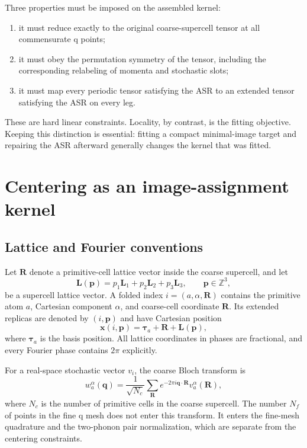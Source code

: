 \documentclass{article}
\newcommand{\Nc}{N_c}
\newcommand{\Nf}{N_f}
\begin{document}
Three properties must be imposed on the assembled kernel:
\begin{enumerate}
    \item it must reduce exactly to the original coarse-supercell tensor at
    all commensurate q points;
    \item it must obey the permutation symmetry of the tensor, including the
    corresponding relabeling of momenta and stochastic slots;
    \item it must map every periodic tensor satisfying the ASR to an extended
    tensor satisfying the ASR on every leg.
\end{enumerate}
These are hard linear constraints. Locality, by contrast, is the fitting
objective. Keeping this distinction is essential: fitting a compact
minimal-image target and repairing the ASR afterward generally changes the
kernel that was fitted.

\section{Centering as an image-assignment kernel}
\label{sec:kernel}

\subsection{Lattice and Fourier conventions}
\label{sec:notation}

Let $\bm R$ denote a primitive-cell lattice vector inside the coarse
supercell, and let
\begin{equation}
    \bm L(\bm p)=p_1\bm L_1+p_2\bm L_2+p_3\bm L_3,
    \qquad \bm p\in\mathbb Z^3,
    \label{eq:supercell-translation}
\end{equation}
be a supercell lattice vector. A folded index $i=(a,\alpha,\bm R)$ contains
the primitive atom $a$, Cartesian component $\alpha$, and coarse-cell
coordinate $\bm R$. Its extended replicas are denoted by
$(i,\bm p)$ and have Cartesian position
\begin{equation}
    \bm x(i,\bm p)=\bm\tau_a+\bm R+\bm L(\bm p),
    \label{eq:extended-position}
\end{equation}
where $\bm\tau_a$ is the basis position. All lattice coordinates in phases
are fractional, and every Fourier phase contains $2\pi$ explicitly.

For a real-space stochastic vector $v_i$, the coarse Bloch transform is
\begin{equation}
    w_a^\alpha(\bm q)
    =\frac{1}{\sqrt{\Nc}}\sum_{\bm R}
    e^{-2\pi i\bm q\cdot\bm R}v_a^\alpha(\bm R),
    \label{eq:coarse-bloch}
\end{equation}
where $\Nc$ is the number of primitive cells in the coarse supercell.
The number $\Nf$ of points in the fine q mesh does not enter this transform.
It enters the fine-mesh quadrature and the two-phonon pair normalization,
which are separate from the centering constraints.
\end{document}
